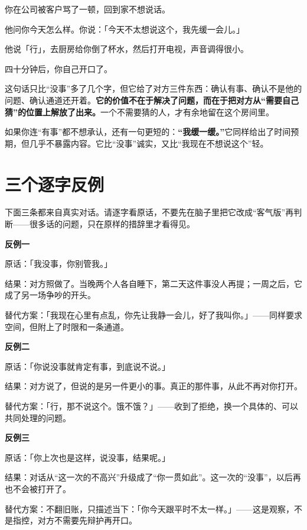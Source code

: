 \par
\begin{mdquote}
你在公司被客户骂了一顿，回到家不想说话。\par
\vspace{0.3\baselineskip}
他问你今天怎么样。你说：「今天不太想说这个，我先缓一会儿。」\par
\vspace{0.3\baselineskip}
他说「行」，去厨房给你倒了杯水，然后打开电视，声音调得很小。\par
\vspace{0.3\baselineskip}
四十分钟后，你自己开口了。\par
\end{mdquote}

这句话只比“没事”多了几个字，但它给了对方三件东西：确认有事、确认不是他的问题、确认通道还开着。\textbf{它的价值不在于解决了问题，而在于把对方从“需要自己猜”的位置上解放了出来。}一个不需要猜的人，才有余地留在这个房间里。

如果你连“有事”都不想承认，还有一句更短的：\textbf{“我缓一缓。”}它同样给出了时间预期，但几乎不暴露内容。它比“没事”诚实，又比“我现在不想说这个”轻。

\section{三个逐字反例}

下面三条都来自真实对话。请逐字看原话，不要先在脑子里把它改成“客气版”再判断——很多话的问题，只在原样的措辞里才看得见。

\textbf{反例一}\par
原话：「我没事，你别管我。」\par
结果：对方照做了。当晚两个人各自睡下，第二天这件事没人再提；一周之后，它成了另一场争吵的开头。\par
替代方案：「我现在心里有点乱，你先让我静一会儿，好了我叫你。」——同样要求空间，但附上了时限和一条通道。

\textbf{反例二}\par
原话：「你说没事就肯定有事，到底说不说。」\par
结果：对方说了，但说的是另一件更小的事。真正的那件事，从此不再对你打开。\par
替代方案：「行，那不说这个。饿不饿？」——收到了拒绝，换一个具体的、可以共同处理的问题。

\textbf{反例三}\par
原话：「你上次也是这样，说没事，结果呢。」\par
结果：对话从“这一次的不高兴”升级成了“你一贯如此”。这一次的“没事”，以后再也不会被打开了。\par
替代方案：不翻旧账，只描述当下：「你今天跟平时不太一样。」——这是观察，不是指控，对方不需要先辩护再开口。

